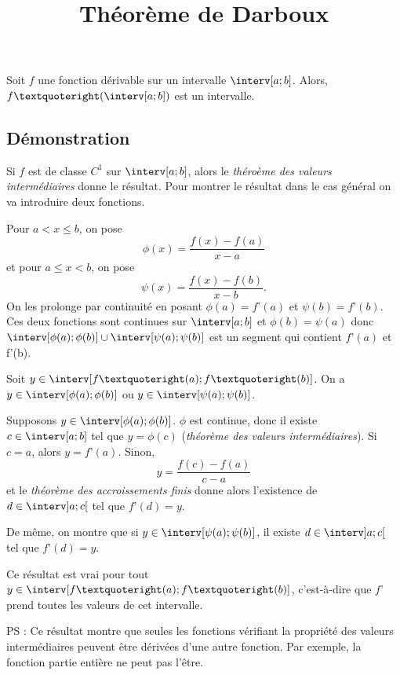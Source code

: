 \documentclass[fontsize=12pt,twoside=false,parskip=half, french]{scrartcl}
\title{Théorème de Darboux}
\date{}
\author{}
\begin{document}
\maketitle
   \begin{Theoreme}
      Soit $f$ une fonction dérivable sur un intervalle $\interv[a; b]$. Alors, $f’(\interv[a; b])$ est un intervalle.
   \end{Theoreme}
   \subsection{Démonstration}
      Si $f$ est de classe $C^1$ sur $\interv[a; b]$, alors le \emph{théroème des valeurs intermédiaires} donne le 
      résultat. Pour montrer le résultat dans le cas général on va introduire deux fonctions. 
      
      Pour $a < x \leq b$, on pose
      \[
         \phi(x) = \frac{f(x) - f(a)}{x - a}
      \]
      et pour $a \leq x < b$, on pose
      \[
         \psi(x) = \frac{f(x) - f(b)}{x - b}.
      \]
      On les prolonge par continuité en posant $\phi(a) = f’(a)$ et $\psi(b) = f’(b)$. Ces deux fonctions sont
      continues sur $\interv[a; b]$ et $\phi(b) = \psi(a)$ donc $\interv[\phi(a); \phi(b)] \cup \interv[\psi(a); \psi(b)]$
      est un segment qui contient $f’(a)$ et f’(b).
      
      Soit $y \in \interv[f’(a); f’(b)]$. On a $y \in \interv[\phi(a); \phi(b)]$ ou $y \in \interv[\psi(a); \psi(b)]$.
      
      Supposons $y \in \interv[\phi(a); \phi(b)]$. $\phi$ est continue, donc il existe $c \in \interv[a; b]$ tel que
      $y = \phi(c)$ (\emph{théorème des valeurs intermédiaires}). Si $c = a$, alors $y = f’(a)$. Sinon,
      \[
         y = \frac{f(c) - f(a)}{c - a}
      \]
      et le \emph{théorème des accroissements finis} donne alors l’existence de $d \in \interv]a; c[$ tel que 
      $f’(d) = y$.
      
      De même, on montre que si $y \in \interv[\psi(a); \psi(b)]$, il existe $d \in \interv]a; c[$ tel que 
      $f’(d) = y$.
      
      Ce résultat est vrai pour tout $y \in \interv[f’(a); f’(b)]$, c’est-à-dire que $f’$ prend toutes les valeurs 
      de cet intervalle.

      PS : Ce résultat montre que seules les fonctions vérifiant la propriété des valeurs intermédiaires peuvent être
      dérivées d’une autre fonction. Par exemple, la fonction partie entière ne peut pas l’être.
\end{document}
